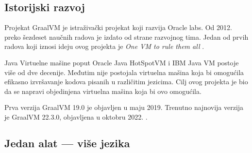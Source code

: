 \documentclass[a4paper]{article}
\begin{document}
\subsection{Istorijski razvoj}
\label{subsec:istorija}

Projekat GraalVM je istraživački projekat koji razvija Oracle labs. Od 2012. preko šezdeset naučnih radova je izdato od strane razvojnog tima. Jedan od prvih radova koji iznosi ideju ovog projekta je \textit{One VM to rule them all} \cite{onevmtorulethemall}.

Java Virtuelne mašine poput Oracle Java HotSpotVM i IBM Java VM postoje više od dve decenije. Međutim nije postojala virtuelna mašina koja bi omogućila efikasno izvršavanje kodova pisanih u različitim jezicima. Cilj ovog projekta je bio da se napravi objedinjena virtuelna mašina koja bi ovo omogućila.

Prva verzija GraalVM 19.0 je objavljen u maju 2019. Trenutno najnovija verzija je GraalVM 22.3.0, objavljena u oktobru 2022. \cite{graalvmreleases}.

\subsection{Jedan alat --- više jezika}
\label{subsec:alatjezik}
\end{document}

